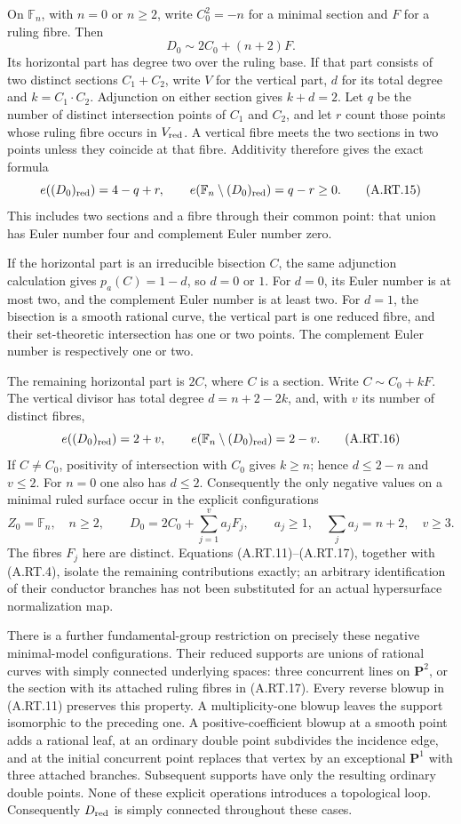 On $\mathbb F_n$, with $n=0$ or $n\ge2$, write $C_0^2=-n$
for a minimal section and $F$ for a ruling fibre. Then
\[
 D_0\sim 2C_0+(n+2)F.
 \tag{A.RT.14}
\]
Its horizontal part has degree two over the ruling base.
If that part consists of two distinct sections $C_1+C_2$,
write $V$ for the vertical part, $d$ for its total degree and
$k=C_1\cdot C_2$. Adjunction on either section gives
$k+d=2$. Let $q$ be the number of distinct intersection
points of $C_1$ and $C_2$, and let $r$ count those points
whose ruling fibre occurs in $V_{\rm red}$. A vertical fibre
meets the two sections in two points unless they coincide at
that fibre. Additivity therefore gives the exact formula
\[
 e((D_0)_{\rm red})=4-q+r,
 \qquad e(\mathbb F_n\setminus(D_0)_{\rm red})=q-r\ge0.
 \tag{A.RT.15}
\]
This includes two sections and a fibre through their common
point: that union has Euler number four and complement Euler
number zero.

If the horizontal part is an irreducible bisection $C$, the
same adjunction calculation gives $p_a(C)=1-d$, so $d=0$
or $1$. For $d=0$, its Euler number is at most two, and the
complement Euler number is at least two. For $d=1$, the
bisection is a smooth rational curve, the vertical part is one
reduced fibre, and their set-theoretic intersection has one or
two points. The complement Euler number is respectively one
or two.

The remaining horizontal part is $2C$, where $C$ is a section.
Write $C\sim C_0+kF$. The vertical divisor has total degree
$d=n+2-2k$, and, with $v$ its number of distinct fibres,
\[
 e((D_0)_{\rm red})=2+v,
 \qquad e(\mathbb F_n\setminus(D_0)_{\rm red})=2-v.
 \tag{A.RT.16}
\]
If $C\ne C_0$, positivity of intersection with $C_0$ gives
$k\ge n$; hence $d\le2-n$ and $v\le2$.
For $n=0$ one also has $d\le2$. Consequently the only
negative values on a minimal ruled surface occur in the
explicit configurations
\[
 Z_0=\mathbb F_n,\quad n\ge2,\qquad
 D_0=2C_0+\sum_{j=1}^{v}a_jF_j,\qquad
 a_j\ge1,\quad \sum_j a_j=n+2,\quad v\ge3.
 \tag{A.RT.17}
\]
The fibres $F_j$ here are distinct. Equations
(A.RT.11)--(A.RT.17), together with (A.RT.4), isolate the
remaining contributions exactly; an arbitrary identification
of their conductor branches has not been substituted for an
actual hypersurface normalization map.

There is a further fundamental-group restriction on precisely
these negative minimal-model configurations. Their reduced
supports are unions of rational curves with simply connected
underlying spaces: three concurrent lines on $\mathbf P^2$,
or the section with its attached ruling fibres in (A.RT.17).
Every reverse blowup in (A.RT.11) preserves this property.
A multiplicity-one blowup leaves the support isomorphic to
the preceding one. A positive-coefficient blowup at a smooth
point adds a rational leaf, at an ordinary double point
subdivides the incidence edge, and at the initial concurrent
point replaces that vertex by an exceptional $\mathbf P^1$
with three attached branches. Subsequent supports have only
the resulting ordinary double points. None of these explicit
operations introduces a topological loop. Consequently
$D_{\rm red}$ is simply connected throughout these cases.

